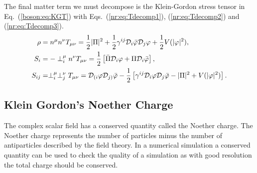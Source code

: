 The final matter term we must decompose is the Klein-Gordon stress tensor in Eq.~(\ref{boson:eq:KGT}) with Eqs.~(\ref{nr:eq:Tdecomp1}), (\ref{nr:eq:Tdecomp2}) and (\ref{nr:eq:Tdecomp3}). \begin{align} \rho &=n^\mu n^\nu T_{\mu\nu} = \frac{1}{2}|\Pi|^2 + \frac{1}{2}\gamma^{ij}\mathcal{D}_i \bar{\varphi} \mathcal{D}_j \varphi +\frac{1}{2}V(|\varphi|^2)
,\\ S_i &= -\perp^\mu_i n^\nu T_{\mu\nu} =  \frac{1}{2}\left[\bar{\Pi} \mathcal{D}_i \varphi  +  \Pi\mathcal{D}_i \bar{\varphi} \right]
,\\ S_{ij} &= \perp^\mu_i \perp^\nu_j T_{\mu\nu} = \mathcal{D}_{(i}\varphi\mathcal{D}_{j)}\bar{\varphi} - \frac{1}{2}\left[ \gamma^{ij}\mathcal{D}_i\varphi\mathcal{D}_j\bar{\varphi} - |\Pi|^2 + V(|\varphi|^2)\right].\end{align}

\subsection{Klein Gordon's Noether Charge}
The complex scalar field has a conserved quantity called the Noether charge. The Noether charge represents the number of particles minus the number of antiparticles described by the field theory. In a numerical simulation a conserved quantity can be used to check the quality of a simulation as with good resolution the total charge should be conserved. 

